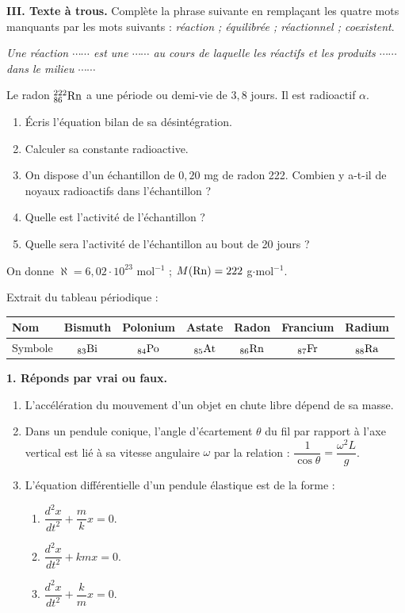 \documentclass[11pt]{article}
\begin{document}
\noindent\textbf{III. Texte à trous.} Complète la phrase suivante en remplaçant les quatre mots manquants par les mots suivants : \textit{réaction ; équilibrée ; réactionnel ; coexistent}.

\textit{Une réaction $\cdots\cdots$ est une $\cdots\cdots$ au cours de laquelle les réactifs et les produits $\cdots\cdots$ dans le milieu $\cdots\cdots$}

Le radon $\mathrm{^{222}_{86}Rn}$ a une période ou demi-vie de $3{,}8$ jours. Il est radioactif $\alpha$.

\begin{enumerate}
  \item Écris l'équation bilan de sa désintégration.
  \item Calculer sa constante radioactive.
  \item On dispose d'un échantillon de $0{,}20$ mg de radon 222. Combien y a-t-il de noyaux radioactifs dans l'échantillon ?
  \item Quelle est l'activité de l'échantillon ?
  \item Quelle sera l'activité de l'échantillon au bout de 20 jours ?
\end{enumerate}
\noindent On donne $\aleph = 6{,}02\cdot10^{23}$ mol$^{-1}$ ; $M(\mathrm{Rn}) = 222$ g$\cdot$mol$^{-1}$.

\noindent Extrait du tableau périodique :
\begin{center}\renewcommand{\arraystretch}{1.3}
\begin{tabular}{|l|c|c|c|c|c|c|}
\hline
Nom & Bismuth & Polonium & Astate & Radon & Francium & Radium \\
\hline
Symbole & $\mathrm{_{83}Bi}$ & $\mathrm{_{84}Po}$ & $\mathrm{_{85}At}$ & $\mathrm{_{86}Rn}$ & $\mathrm{_{87}Fr}$ & $\mathrm{_{88}Ra}$ \\
\hline
\end{tabular}
\end{center}



\noindent\textbf{1. Réponds par vrai ou faux.}
\begin{enumerate}[label=\alph*.]
  \item L'accélération du mouvement d'un objet en chute libre dépend de sa masse.
  \item Dans un pendule conique, l'angle d'écartement $\theta$ du fil par rapport à l'axe vertical est lié à sa vitesse angulaire $\omega$ par la relation : $\dfrac{1}{\cos\theta} = \dfrac{\omega^2 L}{g}$.
  \item L'équation différentielle d'un pendule élastique est de la forme :
  \begin{enumerate}[label=c\textsubscript{\arabic*})]
    \item $\dfrac{d^2x}{dt^2} + \dfrac{m}{k}x = 0$.
    \item $\dfrac{d^2x}{dt^2} + kmx = 0$.
    \item $\dfrac{d^2x}{dt^2} + \dfrac{k}{m}x = 0$.
  \end{enumerate}
\end{enumerate}
\end{document}
